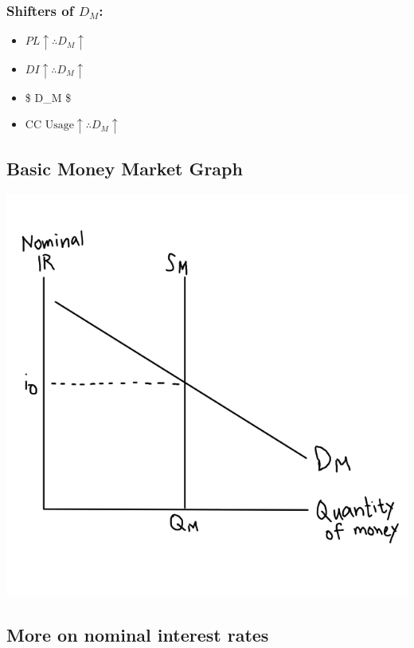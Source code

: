 \documentclass[
  letterpaper,
  DIV=11,
  numbers=noendperiod]{scrartcl}
\providecommand{\tightlist}{%
  \setlength{\itemsep}{0pt}\setlength{\parskip}{0pt}}\usepackage{longtable,booktabs,array}
\begin{document}
\subsubsection{\texorpdfstring{Shifters of
\(D_M\):}{Shifters of D\_M:}}\label{shifters-of-d_m}

\begin{itemize}
\tightlist
\item
  \(PL \uparrow \therefore D_M \uparrow\)
\item
  \(DI \uparrow \therefore D_M \uparrow\)
\item
  \$ \uparrow \therefore D\_M \downarrow \$
\item
  \(\text{CC Usage} \uparrow \therefore D_M \uparrow\)
\end{itemize}

\subsection{Basic Money Market Graph}\label{basic-money-market-graph}

\includegraphics[width=1\textwidth,height=\textheight]{img/money-market.png}

\subsection{More on nominal interest
rates}\label{more-on-nominal-interest-rates}
\end{document}
